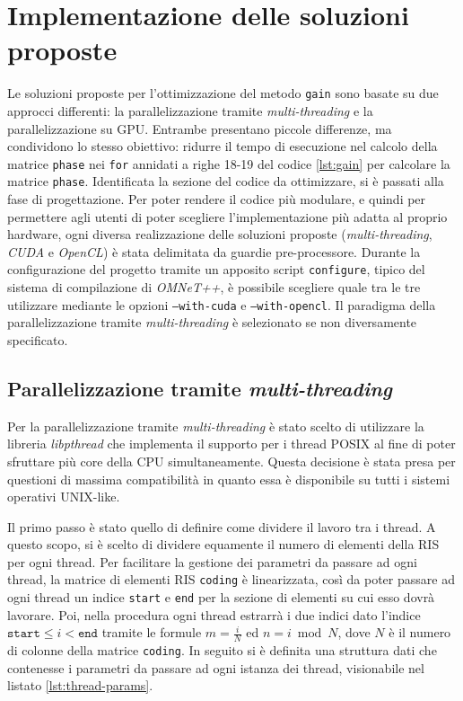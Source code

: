 \section{Implementazione delle soluzioni proposte}
\label{sec:implementazione}

Le soluzioni proposte per l'ottimizzazione del metodo \texttt{gain} sono basate
su due approcci differenti: la parallelizzazione tramite \textit{multi-threading}
e la parallelizzazione su GPU. Entrambe presentano piccole differenze, ma
condividono lo stesso obiettivo: ridurre il tempo di esecuzione nel calcolo della
matrice \texttt{phase} nei \texttt{for} annidati a righe 18-19 del codice \ref{lst:gain}
per calcolare la matrice \texttt{phase}. Identificata la sezione del codice da ottimizzare,
si è passati alla fase di progettazione. Per poter rendere il codice più modulare,
e quindi per permettere agli utenti di poter scegliere l'implementazione più
adatta al proprio hardware, ogni diversa realizzazione delle soluzioni proposte (\textit{multi-threading},
\textit{CUDA} e \textit{OpenCL}) è stata delimitata da guardie pre-processore.
Durante la configurazione del progetto tramite un apposito script \texttt{configure},
tipico del sistema di compilazione di \textit{OMNeT++}, è possibile scegliere
quale tra le tre utilizzare mediante le opzioni \texttt{--with-cuda} e \texttt{--with-opencl}.
Il paradigma della parallelizzazione tramite \textit{multi-threading} è
selezionato se non diversamente specificato.

\subsection{Parallelizzazione tramite \textit{multi-threading}}
\label{subsec:multithreading}

Per la parallelizzazione tramite \textit{multi-threading} è stato scelto di
utilizzare la libreria \textit{libpthread} che implementa il supporto per i thread
POSIX al fine di poter sfruttare più core della CPU simultaneamente. Questa
decisione è stata presa per questioni di massima compatibilità in quanto essa è
disponibile su tutti i sistemi operativi UNIX-like.

Il primo passo è stato quello di definire come dividere il lavoro tra i thread. A
questo scopo, si è scelto di dividere equamente il numero di elementi della RIS
per ogni thread. Per facilitare la gestione dei parametri da passare ad ogni thread,
la matrice di elementi RIS \texttt{coding} è linearizzata, così da poter passare
ad ogni thread un indice \texttt{start} e \texttt{end} per la sezione di
elementi su cui esso dovrà lavorare. Poi, nella procedura ogni thread estrarrà i
due indici dato l'indice $\texttt{start}\le i < \texttt{end}$ tramite le formule
$m = \frac{i}{N}$ ed $n = i \bmod N$, dove $N$ è il numero di colonne della matrice
\texttt{coding}. In seguito si è definita una struttura dati che contenesse i parametri
da passare ad ogni istanza dei thread, visionabile nel listato
\ref{lst:thread-params}.

